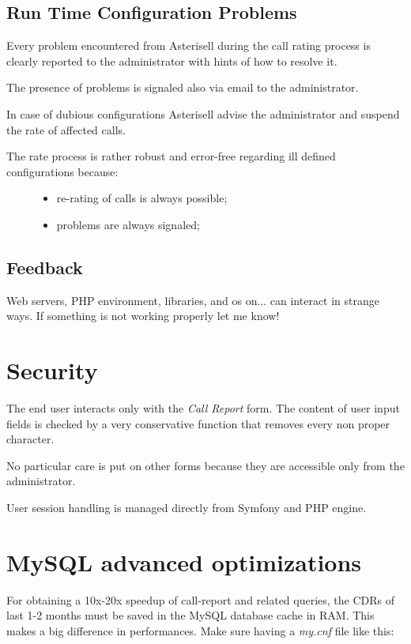 \documentclass[letterpaper,10pt,english]{sphinxmanual}
\begin{document}
\subsection{Run Time Configuration Problems}
\label{index:run-time-configuration-problems}
Every problem encountered from Asterisell during the call rating process is clearly reported to the administrator with hints of how to resolve it.

The presence of problems is signaled also via email to the administrator.

In case of dubious configurations Asterisell advise the administrator and suspend the rate of affected calls.
\begin{description}
\item[{The rate process is rather robust and error-free regarding ill defined configurations because:}] \leavevmode\begin{itemize}
\item {} 
re-rating of calls is always possible;

\item {} 
problems are always signaled;

\end{itemize}

\end{description}


\subsection{Feedback}
\label{index:feedback}
Web servers, PHP environment, libraries, and os on... can interact in strange ways. If something is not working properly let me know!


\section{Security}
\label{index:security}
The end user interacts only with the \emph{Call Report} form. The content of user input fields is checked by a very conservative function that removes every non proper character.

No particular care is put on other forms because they are accessible only from the administrator.

User session handling is managed directly from Symfony and PHP engine.


\section{MySQL advanced optimizations}
\label{index:mysql-advanced-optimizations}
For obtaining a 10x-20x speedup of call-report and related queries, the CDRs of last 1-2 months must be saved in the MySQL database cache in RAM. This makes a big difference in performances. Make sure having a \emph{my.cnf} file like this:
\end{document}
